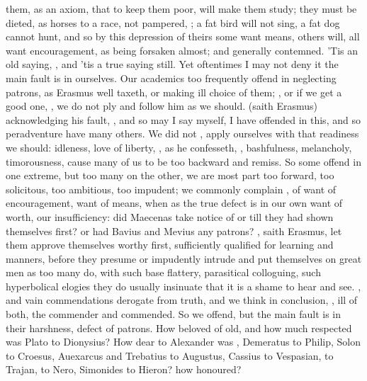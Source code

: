 them, as an axiom, that to keep them poor, will make them study; they must be
dieted, as horses to a race, not pampered, ; a fat bird
will not sing, a fat dog cannot hunt, and so by this depression of theirs
some want means, others will, all want
encouragement, as being forsaken almost; and generally
contemned. 'Tis an old saying, , and 'tis a true saying still. Yet oftentimes I may not deny it the
main fault is in ourselves. Our academics too frequently offend in neglecting
patrons, as Erasmus well taxeth, or making ill choice of
them; , or if we get a good
one, , we do not ply and
follow him as we should.  (saith Erasmus)
acknowledging his fault, , and so may
I say myself, I have offended in this, and so peradventure
have many others. We did not , apply ourselves with that readiness we should: idleness, love of
liberty, , as
he confesseth, , bashfulness,
melancholy, timorousness, cause many of us to be too backward and remiss. So
some offend in one extreme, but too many on the other, we are most part too
forward, too solicitous, too ambitious, too impudent; we commonly complain
, of want of encouragement, want of means, when as the
true defect is in our own want of worth, our insufficiency: did Maecenas take
notice of \Horace{} or \Virgil{} till they had shown themselves first? or had Bavius
and Mevius any patrons? , saith Erasmus, let them
approve themselves worthy first, sufficiently qualified for learning and
manners, before they presume or impudently intrude and put themselves on great
men as too many do, with such base flattery, parasitical colloguing, such
hyperbolical elogies they do usually insinuate that it is a shame to hear and
see. , and vain
commendations derogate from truth, and we think in conclusion, , ill of both, the commender and commended. So we
offend, but the main fault is in their harshness, defect of patrons. How
beloved of old, and how much respected was Plato to Dionysius? How dear to
Alexander was \Aristotle{}, Demeratus to Philip, Solon to Croesus, Auexarcus and
Trebatius to Augustus, Cassius to Vespasian, \Plutarch{} to Trajan, \Seneca{} to
Nero, Simonides to Hieron? how honoured?

